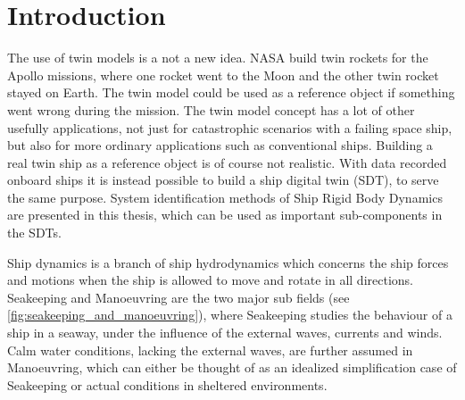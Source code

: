 \chapter{Introduction}
The use of twin models is a not a new idea. NASA build twin rockets for the Apollo missions, where one rocket went to the Moon and the other twin rocket stayed on Earth.
The twin model could be used as a reference object if something went wrong during the mission.  
The twin model concept has a lot of other usefully applications, not just for catastrophic scenarios with a failing space ship, but also for more ordinary applications such as conventional ships. Building a real twin ship as a reference object is of course not realistic. With data recorded onboard ships it is instead possible to build a ship digital twin (SDT), to serve the same purpose.
System identification methods of Ship Rigid Body Dynamics are presented in this thesis, which can be used as important sub-components in the SDTs. 

Ship dynamics is a branch of ship hydrodynamics which concerns the ship forces and motions when the ship is allowed to move and rotate in all directions. Seakeeping and Manoeuvring are the two major sub fields (see \autoref{fig:seakeeping_and_manoeuvring}), where Seakeeping studies the  behaviour of a ship in a seaway, under the influence of the external waves, currents and winds. Calm water conditions, lacking the external waves, are further assumed in Manoeuvring, which can either be thought of as an idealized simplification case of Seakeeping or actual conditions in sheltered environments. 


